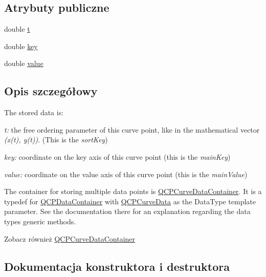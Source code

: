 \subsection*{Atrybuty publiczne}
\begin{DoxyCompactItemize}
\item 
double \hyperlink{class_q_c_p_curve_data_aecc395525be28e9178a088793beb3ff3}{t}
\item 
double \hyperlink{class_q_c_p_curve_data_a8a4ec5f2b9a396149fd842e309701bd4}{key}
\item 
double \hyperlink{class_q_c_p_curve_data_a72b39b8e1dbf7b45382ebd48419b6828}{value}
\end{DoxyCompactItemize}


\subsection{Opis szczegółowy}
The stored data is\+: \begin{DoxyItemize}
\item {\itshape t\+:} the free ordering parameter of this curve point, like in the mathematical vector {\itshape (x(t), y(t))}. (This is the {\itshape sort\+Key}) \item {\itshape key\+:} coordinate on the key axis of this curve point (this is the {\itshape main\+Key}) \item {\itshape value\+:} coordinate on the value axis of this curve point (this is the {\itshape main\+Value})\end{DoxyItemize}
The container for storing multiple data points is \hyperlink{qcustomplot_8hh_aaeee80d5664ea91beb9d7968790d0e65}{Q\+C\+P\+Curve\+Data\+Container}. It is a typedef for \hyperlink{class_q_c_p_data_container}{Q\+C\+P\+Data\+Container} with \hyperlink{class_q_c_p_curve_data}{Q\+C\+P\+Curve\+Data} as the Data\+Type template parameter. See the documentation there for an explanation regarding the data type\textquotesingle{}s generic methods.

\begin{DoxySeeAlso}{Zobacz również}
\hyperlink{qcustomplot_8hh_aaeee80d5664ea91beb9d7968790d0e65}{Q\+C\+P\+Curve\+Data\+Container} 
\end{DoxySeeAlso}


\subsection{Dokumentacja konstruktora i destruktora}
